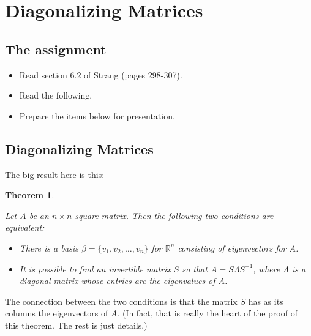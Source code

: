 \documentclass[10pt,]{book}
\theoremstyle{plain}
\newtheorem{theorem}{Theorem}[chapter]
\theoremstyle{definition}
\numberwithin{equation}{section}
\begin{document}
\section[Diagonalizing Matrices]{Diagonalizing Matrices}\label{section-diagonalization}
\typeout{************************************************}
\typeout{************************************************}
\subsection[The assignment]{The assignment}\label{subsection-130}
\begin{itemize}
\item{} Read section 6.2 of Strang (pages 298-307).\item{} Read the following.\item{} Prepare the items below for presentation.\end{itemize}
\typeout{************************************************}
\typeout{************************************************}
\subsection[Diagonalizing Matrices]{Diagonalizing Matrices}\label{subsection-131}

      The big result here is this:
\begin{theorem}\label{theorem-10}

        Let \(A\) be an \(n\times n\) square matrix. Then the following
        two conditions are equivalent:
        \begin{itemize}
\item{}
            There is a basis \(\beta= \{ v_1, v_2, \ldots, v_n \}\) for
            \(\mathbb{R}^n\) consisting of eigenvectors for \(A\).
          \item{}
            It is possible to find an invertible matrix \(S\) so that
            \(A = S \Lambda S^{-1}\), where \(\Lambda\) is a diagonal
            matrix whose entries are the eigenvalues of \(A\).
          \end{itemize}
\end{theorem}
\par

      The connection between the two conditions is that the matrix \(S\) has
      as its columns the eigenvectors of \(A\). (In fact, that is really the
      heart of the proof of this theorem. The rest is just details.)
\par
\end{document}
